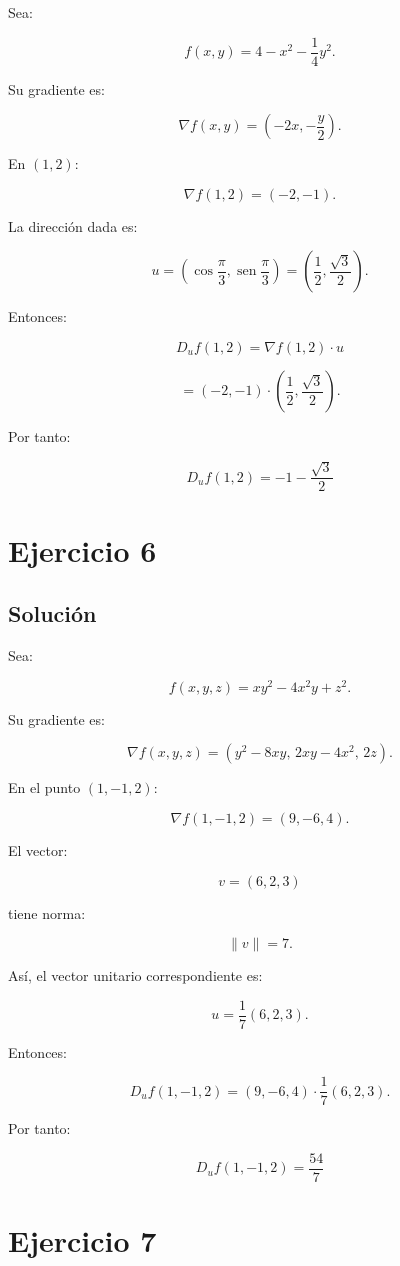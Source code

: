 \documentclass[11pt,a4paper]{article}
\newcommand{\sen}{\operatorname{sen}}
\begin{document}
Sea:

\[
f(x,y)
=
4-x^2-\frac14y^2.
\]

Su gradiente es:

\[
\nabla f(x,y)
=
\left(-2x,-\frac y2\right).
\]

En \((1,2)\):

\[
\nabla f(1,2)=(-2,-1).
\]

La dirección dada es:

\[
u=
\left(
\cos\frac{\pi}{3},
\sen\frac{\pi}{3}
\right)
=
\left(
\frac12,
\frac{\sqrt3}{2}
\right).
\]

Entonces:

\[
D_u f(1,2)
=
\nabla f(1,2)\cdot u
\]

\[
=
(-2,-1)
\cdot
\left(
\frac12,
\frac{\sqrt3}{2}
\right).
\]

Por tanto:

\[
\boxed{
D_u f(1,2)
=
-1-\frac{\sqrt3}{2}
}
\]

\section{Ejercicio 6}
\subsection{Solución}

Sea:

\[
f(x,y,z)
=
xy^2-4x^2y+z^2.
\]

Su gradiente es:

\[
\nabla f(x,y,z)
=
\left(
y^2-8xy,\,
2xy-4x^2,\,
2z
\right).
\]

En el punto \((1,-1,2)\):

\[
\nabla f(1,-1,2)
=
(9,-6,4).
\]

El vector:

\[
v=(6,2,3)
\]

tiene norma:

\[
\|v\|=7.
\]

Así, el vector unitario correspondiente es:

\[
u=
\frac17(6,2,3).
\]

Entonces:

\[
D_u f(1,-1,2)
=
(9,-6,4)
\cdot
\frac17(6,2,3).
\]

Por tanto:

\[
\boxed{
D_u f(1,-1,2)
=
\frac{54}{7}
}
\]

\section{Ejercicio 7}
\end{document}
